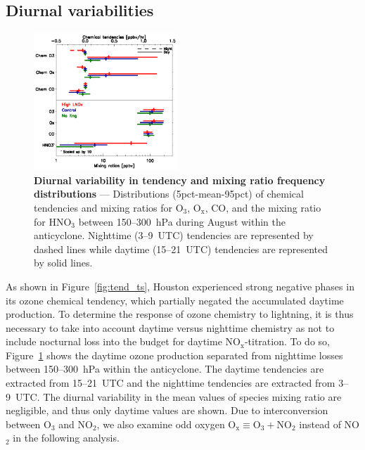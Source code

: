 \subsection{Diurnal variabilities}

\begin{figure}
	\centering
	\begin{singlespacing}
	\includegraphics[width=0.48\textwidth]{Figures/ltngsens_diurnal.eps}
	\caption[Diurnal variability in tendency and mixing ratio frequency distributions]{{\small
	\textbf{Diurnal variability in tendency and mixing ratio frequency distributions} ---
	Distributions (5pct-mean-95pct) of chemical tendencies
	and mixing ratios for O$_3$, O$_{\mathrm{x}}$, CO, and the mixing ratio
	for HNO$_3$ between 150--300~hPa during August within the
	anticyclone. Nighttime (3--9~UTC) tendencies are represented by dashed
	lines while daytime (15--21~UTC) tendencies are represented by solid lines.}}
	\label{fig:ltng_di}
	\end{singlespacing}
\end{figure}

As shown in Figure~\ref{fig:tend_ts}, Houston experienced strong negative phases in its ozone chemical tendency,
which partially negated the accumulated daytime production. To determine the
response of ozone chemistry to lightning, it is thus necessary to take into account
daytime versus nighttime chemistry as not to include nocturnal loss into the budget
for daytime NO$_{\mathrm{x}}$-titration. To do so, Figure~\ref{fig:ltng_di} shows the
daytime ozone production separated from nighttime losses between 150--300~hPa within
the anticyclone. The daytime tendencies are extracted from 15--21~UTC and the
nighttime tendencies are extracted from 3--9~UTC. The diurnal variability in the
mean values of species mixing ratio are negligible, and thus only daytime values
are shown. Due to interconversion between O$_3$ and NO$_2$, we also examine
odd oxygen $\mathrm{O_x\equiv O_3+NO_2}$ instead of NO$_2$ in the following
analysis.

